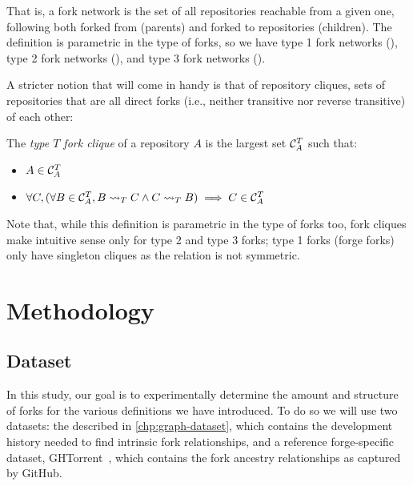 That is, a fork network is the set of all repositories reachable from a given
one, following both forked from (parents) and forked to repositories
(children). The definition is parametric in the type of forks, so we have type
1 fork networks (\networkI), type 2 fork networks (\networkII), and type 3 fork
networks (\networkIII).

A stricter notion that will come in handy is that of repository cliques, sets
of repositories that are all direct forks (i.e., neither transitive nor reverse
transitive) of each other:
\begin{definition}
  \label{def:fork-clique}
  The \emph{type $T$ fork clique} of a repository $A$ is the largest set
  $\mathcal{C}^T_A$ such that:
  \begin{itemize}
  \item $A\in\mathcal{C}^T_A$
  \item $\forall C, (\forall B \in \mathcal{C}^T_A, B\rightsquigarrow_T C \land C\rightsquigarrow_T B) \implies C\in\mathcal{C}^T_A$
  \end{itemize}
\end{definition}

Note that, while this definition is parametric in the type of forks too, fork
cliques make intuitive sense only for type 2 and type 3 forks; type 1 forks
(forge forks) only have singleton cliques as the relation is not symmetric.


\section{Methodology}
\label{sec:forks-methodology}


\subsection{Dataset}
\label{sec:forks-dataset}

In this study, our goal is to experimentally determine the amount and structure
of forks for the various definitions we have introduced. To do so we will use
two datasets: the \SWHGD{} described in \cref{chp:graph-dataset}, which
contains the development history needed to find intrinsic fork relationships,
and a reference forge-specific dataset, GHTorrent~\cite{GHTorrent}, which
contains the fork ancestry relationships as captured by GitHub.

